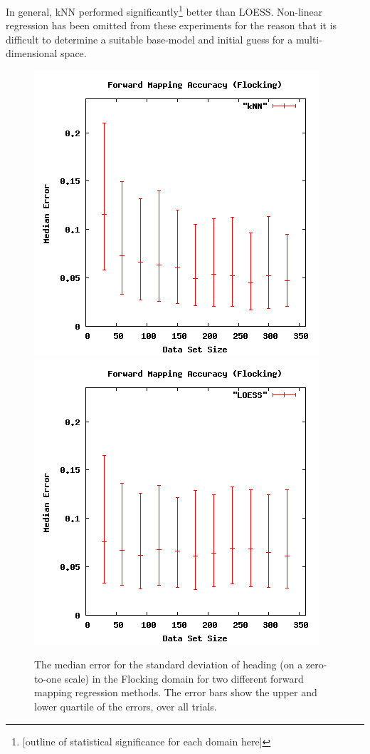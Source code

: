 In general, kNN performed significantly\footnote{[outline of statistical significance for each domain here]} better than LOESS.
Non-linear regression has been omitted from these experiments for the reason that it is difficult to determine a suitable base-model and initial guess for a multi-dimensional space.

\begin{figure}[ht]
\centering
\includegraphics[scale=.4]{images/results_flocking/fmacc-kNN.png}
\includegraphics[scale=.4]{images/results_flocking/fmacc-LOESS.png}
\caption{The median error for the standard deviation of heading (on a zero-to-one scale) in the Flocking domain for two different forward mapping regression methods.
The error bars show the upper and lower quartile of the errors, over all trials.}
\label{fig:flockfmacc}
\end{figure}

